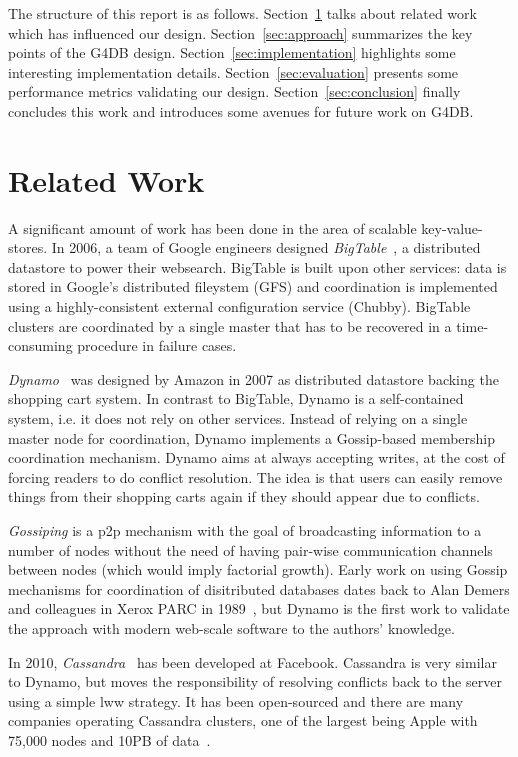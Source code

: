 The structure of this report is as follows.
Section~\ref{sec:related-work} talks about related work which has influenced our design.
Section~\ref{sec:approach} summarizes the key points of the G4DB design.
Section~\ref{sec:implementation} highlights some interesting implementation details.
Section~\ref{sec:evaluation} presents some performance metrics validating our design.
Section~\ref{sec:conclusion} finally concludes this work and introduces some avenues for future work on G4DB.

\section{Related Work}
\label{sec:related-work}
A significant amount of work has been done in the area of scalable key-value-stores.
In 2006, a team of Google engineers designed \emph{BigTable}~\cite{Chang2006},
a distributed datastore to power their websearch.
BigTable is built upon other services: data is stored in
Google's distributed fileystem (GFS) and coordination is implemented using
a highly-consistent external configuration service (Chubby).
BigTable clusters are coordinated by a single master that has to be recovered
in a time-consuming procedure in failure cases.

\emph{Dynamo}~\cite{DeCandia2007} was designed by Amazon in 2007 as
distributed datastore backing the shopping cart system.
In contrast to BigTable, Dynamo is a self-contained system, i.e. it does not rely on other services.
Instead of relying on a single master node for coordination, Dynamo implements a
Gossip-based membership coordination mechanism.
Dynamo aims at always accepting writes, at the cost of forcing readers to
do conflict resolution.
The idea is that users can easily remove things from their shopping carts again
if they should appear due to conflicts.

\emph{Gossiping} is a \ac{p2p} mechanism with the goal of broadcasting information
to a number of nodes without the need of having pair-wise communication channels
between nodes (which would imply factorial growth).
Early work on using Gossip mechanisms for coordination of disitributed
databases dates back to Alan Demers and colleagues in Xerox PARC in 1989~\cite{Demers1987},
but Dynamo is the first work to validate the approach with modern web-scale software
to the authors' knowledge.

In 2010, \emph{Cassandra}~\cite{Lakshman2010} has been developed at Facebook.
Cassandra is very similar to Dynamo, but moves the responsibility of resolving
conflicts back to the server using a simple \ac{lww} strategy.
It has been open-sourced and there are many companies operating Cassandra clusters,
one of the largest being Apple with 75,000 nodes and 10PB of data~\cite{Cassandra}.

